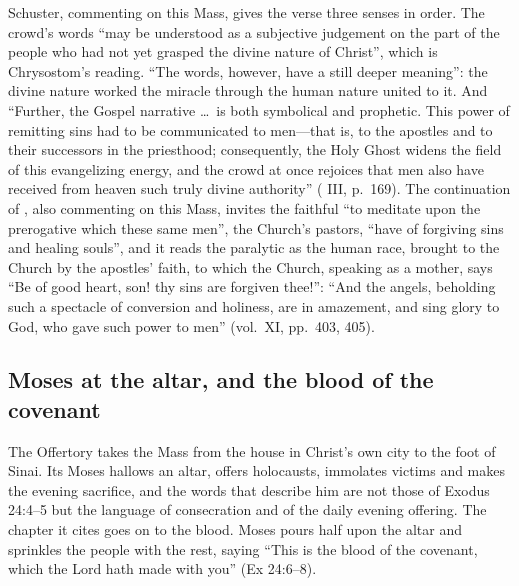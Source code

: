 Schuster, commenting on this Mass, gives the verse three senses in order. The
crowd's words ``may be understood as a subjective judgement on the part of the
people who had not yet grasped the divine nature of Christ'', which is
Chrysostom's reading. ``The words, however, have a still deeper meaning'': the
divine nature worked the miracle through the human nature united to it. And
``Further, the Gospel narrative \dots\ is both symbolical and prophetic. This
power of remitting sins had to be communicated to men---that is, to the
apostles and to their successors in the priesthood; consequently, the Holy
Ghost widens the field of this evangelizing energy, and the crowd at once
rejoices that men also have received from heaven such truly divine authority''
( III, p.~169). The continuation of , also commenting on this Mass, invites the faithful ``to meditate upon the
prerogative which these same men'', the Church's pastors, ``have of forgiving
sins and healing souls'', and it reads the paralytic as the human race, brought
to the Church by the apostles' faith, to which the Church, speaking as a
mother, says ``Be of good heart, son! thy sins are forgiven thee!'': ``And the
angels, beholding such a spectacle of conversion and holiness, are in
amazement, and sing glory to God, who gave such power to men'' (vol.~XI,
pp.~403, 405).

\subsection{Moses at the altar, and the blood of the covenant}

The Offertory takes the Mass from the house in Christ's own city to the foot of Sinai.
Its Moses hallows an altar, offers holocausts, immolates victims and makes the
evening sacrifice, and the words that describe him are not those of Exodus
24:4--5 but the language of consecration and of the daily evening offering.
The chapter it cites goes on to the blood. Moses pours half upon the altar and
sprinkles the people with the rest, saying ``This is the blood of the
covenant, which the Lord hath made with you'' (Ex 24:6--8).

